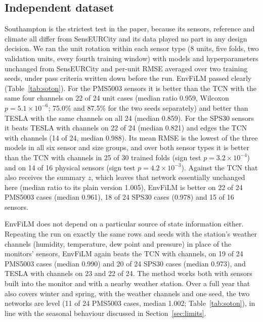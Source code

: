 \documentclass[journal]{IEEEtran}
\begin{document}
\begin{table}[t]
\centering
\caption{RMSE (\textup{\textmu g/m$^3$}) on the true-reference benchmark (10-minute data, official split, mean of three
seeds). Best per row in bold.}
\label{tab:ref}

\end{table}

\subsection{Independent dataset}
\label{sec:soton}

Southampton is the strictest test in the paper, because its sensors, reference and climate all differ from
SensEURCity and its data played no part in any design decision. We ran the unit rotation within each sensor type (8 units, five
folds, two validation units, every fourth training window) with models and hyperparameters unchanged from SensEURCity
and per-unit RMSE averaged over two training seeds, under pass criteria written down before the run. EnvFiLM passed
clearly (Table~\ref{tab:soton}). For the PMS5003 sensors it is better than the TCN with the same four channels on 22 of
24 unit cases (median ratio 0.959, Wilcoxon $p = 5.1\times10^{-6}$; 75.0\% and 87.5\% for the two seeds separately) and
better than TESLA with the same channels on all 24 (median 0.859). For the SPS30 sensors it beats TESLA with channels on
22 of 24 (median 0.821) and edges the TCN with channels (14 of 24, median 0.988). Its mean RMSE is the lowest of the
three models in all six sensor and size groups, and over both sensor types it is better than the TCN with channels in
25 of 30 trained folds (sign test $p = 3.2\times10^{-4}$) and on 14 of 16 physical sensors (sign test
$p = 4.2\times10^{-3}$). Against the TCN that also receives the summary $z$, which leaves that network essentially
unchanged here (median ratio to its plain version 1.005), EnvFiLM is better on 22 of 24 PMS5003 cases (median 0.961),
18 of 24 SPS30 cases (0.978) and 15 of 16 sensors.

EnvFiLM does not depend on a particular source of state information either. Repeating the run on exactly the same rows
and seeds with the station's weather channels (humidity, temperature, dew point and pressure) in place of the monitors'
sensors, EnvFiLM again beats the TCN with channels, on 19 of 24 PMS5003 cases (median 0.990) and 20 of 24 SPS30 cases
(median 0.973), and TESLA with channels on 23 and 22 of 24. The method works both with sensors built into the
monitor and with a nearby weather station. Over a full year that also covers winter and spring, with the weather
channels and one seed, the two networks are level (11 of 24 PMS5003 cases, median 1.002; Table~\ref{tab:soton}), in
line with the seasonal behaviour discussed in Section~\ref{sec:limits}.
\end{document}
